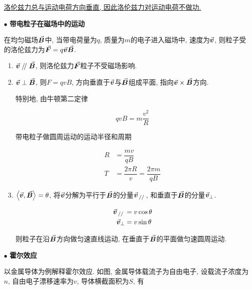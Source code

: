 \underline{洛伦兹力总与运动电荷方向垂直, 因此洛伦兹力对运动电荷不做功. }

\vskip 0.3cm

$\bullet$ \textbf{带电粒子在磁场中的运动}

在均匀磁场$\va*{B}$中, 当带电荷量为$q$, 质量为$m$的电子进入磁场中, 速度为$\va*{v}$, 则粒子受的洛伦兹力为$\va*{F} = q\va*{v}\va*{B}$. 

\begin{enumerate}[itemindent=1em]
	
	\item $\va*{v}{}\kern 0.56em/\kern -0.8em /\kern 0.56em{}\va*{B}$, 则洛伦兹力$\va*{F}$粒子不受磁场影响. 
	
	\item $\va*{v} \perp \va*{B}$, 则$F = qvB$, 方向垂直于$\va*{v}$与$\va*{B}$组成平面, 指向$\va*{v} \times \va*{B}$方向. 
	
	特别地, 由牛顿第二定律
	
	\begin{equation}
		qvB = m \dfrac{v^2}{R} \label{C8-eq10}
	\end{equation}
	
	带电粒子做圆周运动的运动半径和周期
	
	\begin{align*}
		R &= \dfrac{mv}{qB} \\
		T &= \dfrac{2\pi R}{v} = \dfrac{2\pi m}{qB}
	\end{align*}
	
	\item $\left\langle \va*{v},\va*{B} \right\rangle = \theta$, 将$\va*{v}$分解为平行于$\va*{B}$的分量$\va*{v}_{\kern 0.56em/\kern -0.8em /\kern 0.56em}$, 和垂直于$\va*{B}$的分量$\va*{v}_{\bot}$. 
	
	\begin{align*}
		\va*{v}_{\kern 0.56em/\kern -0.8em /\kern 0.56em} &= v \cos\theta \\
		\va*{v}_{\bot} &= v \sin\theta \\
	\end{align*}
	
	则粒子在沿$\va*{B}$方向做匀速直线运动, 在垂直于$\va*{B}$的平面做匀速圆周运动. 
	
\end{enumerate}

$\bullet$ \textbf{霍尔效应}

以金属导体为例解释霍尔效应. 如图, 金属导体载流子为自由电子, 设载流子浓度为$n$, 自由电子漂移速率为$v$, 导体横截面积为$S$, 有

